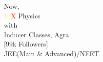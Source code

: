 \documentclass{article}
\begin{document}
\setlength{\noindent}
\Huge
Now,\\
\textcolor{yellow}{10}\textcolor{red}{X} Physics \\
with\\
Inducer Classes, Agra\\

[99k Followers]\\



JEE(Main \& Advanced)/NEET
\end{document}
